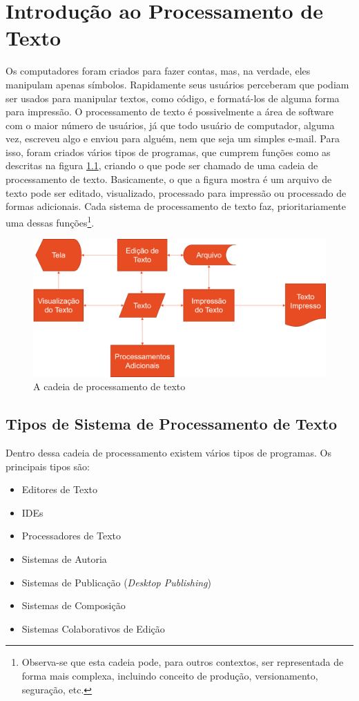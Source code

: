 \chapter{Introdução ao Processamento de Texto}
\label{chap:ProcText}

Os computadores foram criados para fazer contas, mas, na verdade, eles manipulam apenas símbolos. Rapidamente seus usuários perceberam que podiam ser usados para manipular textos, como código, e formatá-los de alguma forma para impressão. O processamento de texto é possivelmente a área de software com o maior número de usuários, já que todo usuário de computador, alguma vez, escreveu algo e enviou para alguém, nem que seja um simples e-mail. Para isso, foram criados vários tipos de programas, que cumprem funções como as descritas na figura \ref{fig:cadeia}, criando o que pode ser chamado de uma cadeia de processamento de texto. Basicamente, o que a figura mostra é um arquivo de texto pode ser editado, visualizado, processado para impressão ou processado de formas adicionais. Cada sistema de processamento de texto faz, prioritariamente uma dessas funções\footnote{Observa-se que esta cadeia pode, para outros contextos, ser representada de forma mais complexa, incluindo conceito de produção, versionamento, seguração, etc.}. 


\begin{figure}[hbt]
    \centering
    \includegraphics[width=0.7\linewidth]{Images/cadeia}
    \caption[A cadeia de processamento de texto]{A cadeia de processamento de texto}
    \label{fig:cadeia}
\end{figure}

\section{Tipos de Sistema de Processamento de Texto}

Dentro dessa cadeia de processamento existem vários tipos de programas. Os principais tipos são:
\begin{itemize}
    \item Editores de Texto
    \item IDEs
    \item Processadores de Texto
    \item Sistemas de Autoria
    \item Sistemas de Publicação (\textit{Desktop Publishing})
    \item Sistemas de Composição
    \item Sistemas Colaborativos de Edição
\end{itemize}

